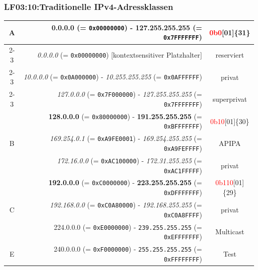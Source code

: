 
\begin{frame}
  \frametitle{LF03:10:Traditionelle IPv4-Adressklassen}

\begin{footnotesize}

  \begin{tabular}{|c|r|c|}
 
  \hline
  \multirow{3}{*}{A} & \textbf{0.0.0.0} (= \texttt{0x00000000}) - \textbf{127.255.255.255} (= \texttt{0x7FFFFFFF}) & \tiny{\textcolor{red}{0b0}[01]\{31\}}\\
    \cline{2-3} 
    & \tiny{\textit{0.0.0.0} (= \texttt{0x00000000})}  [\tiny{kontextsensitiver Platzhalter}]  & \tiny{reserviert}\\
    \cline{2-3} 
    & \tiny{\textit{10.0.0.0} (= \texttt{0x0A000000})} - \tiny{\textit{10.255.255.255} (= \texttt{0x0AFFFFFF})} & \tiny{privat}\\
    \cline{2-3} 
    & \tiny{\textit{127.0.0.0} (= \texttt{0x7F000000})} - \tiny{\textit{127.255.255.255} (= \texttt{0x7FFFFFFF})} & \tiny{superprivat} \\
  \hline
  \multirow{3}{*}{B} & \textbf{128.0.0.0} (= \texttt{0x80000000}) - \textbf{191.255.255.255} (= \texttt{0xBFFFFFFF}) & \tiny{\textcolor{red}{0b10}[01]\{30\}} \\
    \cline{2-3} 
    & \tiny{\textit{169.254.0.1}} (= \texttt{0xA9FE0001}) - \tiny{\textit{169.254.255.255} (= \texttt{0xA9FEFFFF})} & \tiny{APIPA}\\
    \cline{2-3} 
    & \tiny{\textit{172.16.0.0} (= \texttt{0xAC100000})} - \tiny{\textit{172.31.255.255} (= \texttt{0xAC1FFFFF})} & \tiny{privat}\\
  \hline
  \multirow{3}{*}{C} & \textbf{192.0.0.0} (= \texttt{0xC0000000}) - \textbf{223.255.255.255} (= \texttt{0xDFFFFFFF}) & \tiny{\textcolor{red}{0b110}[01]\{29\}} \\
    \cline{2-3} 
    & \tiny{\textit{192.168.0.0}} (= \texttt{0xC0A80000}) - \tiny{\textit{192.168.255.255}} (= \texttt{0xC0A8FFFF}) & \tiny{privat}\\
  \hline
  D & 224.0.0.0 (= \texttt{0xE0000000}) - \texttt{239.255.255.255} (= \texttt{0xEFFFFFFF}) & \tiny{Multicast} \\
  \hline
  E & 240.0.0.0 (= \texttt{0xF0000000}) - \texttt{255.255.255.255} (= \texttt{0xFFFFFFFF}) & \tiny{Test}\\
  \hline
\end{tabular}

\end{footnotesize}

\end{frame}

